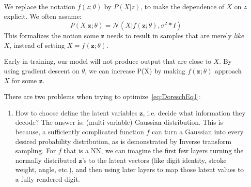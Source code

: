 \documentclass{article}
\begin{document}
We replace the notation $f(z ; \theta)$ by $P(X|z)$, to make the dependence of $X$ on $z$ explicit. 
We often assume:
\begin{equation} \label{eq:DoreschEq1}
  P(X | \bm{z} ; \theta) = \mathcal{N}(X | f(\bm{z} ; \theta), \sigma ^2 * I)
\end{equation}
This formalizes the notion some $\bm{z}$ needs to result in samples that are merely \textit{like} $X$, instead of setting $X = f( \bm{z} ; \theta)$. 

Early in training, our model will not produce output that are close to $X$. By using gradient descent on $\theta$, we can increase P(X) by making $f(\bm{z} ; \theta)$ approach $X$ for some $\bm{z}$. 

There are two problems when trying to optimize~\cref{eq:DoreschEq1}:
\begin{enumerate}

  \item How to choose define the latent variables $\bm{z}$, i.e. decide what information they decode? The answer is: (multi-variable) Gaussian distribution. 
  This is because, a sufficiently complicated function $f$ can turn a Gaussian into every desired probability distribution, as is demonstrated by Inverse transform sampling. 
  For $f$ that is a  NN, we can imagine the first few layers turning the normally distributed $\bm{z}$'s to the latent vectors (like digit identity, stroke weight, angle, etc.), and then using later layers to map those latent values to a fully-rendered digit. 


\end{enumerate}
\end{document}
